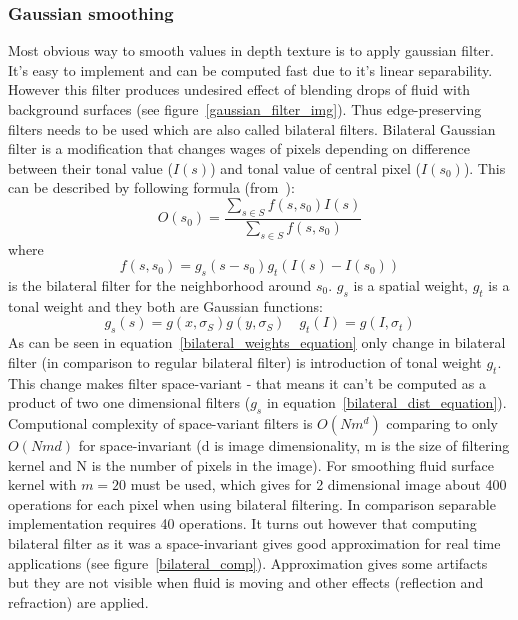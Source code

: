 \subsubsection{Gaussian smoothing} \label{sec:gaussiansmoothing}
Most obvious way to smooth values in depth texture is to apply gaussian filter. It's easy to implement and can be computed fast due to it's linear separability. However this filter produces undesired effect of blending drops of fluid with background surfaces (see figure~\ref{gaussian_filter_img}). 
Thus edge-preserving filters needs to be used which are also called bilateral filters. Bilateral Gaussian filter is a modification that changes wages of pixels depending on difference between their tonal value ($I(s)$) and tonal value of central pixel ($I(s_0)$). This can be described by following formula (from~\cite{PhamVliet2005}): 
\begin{equation}
\label{bilateral_equation}
O(s_0) = \frac{\sum_{s \in S}f(s, s_0)I(s)}{\sum_{s \in S}f(s, s_0)}
\end{equation}
where 
\begin{equation}
\label{bilateral_weights_equation}
f(s, s_0) = g_s(s-s_0)g_t(I(s)-I(s_0))
\end{equation}
is the bilateral filter for the neighborhood around $s_0$. $g_s$ is a spatial weight, $g_t$ is a tonal weight and they both are Gaussian functions:
\begin{equation}
\label{bilateral_dist_equation}
g_s(s) = g(x, \sigma_S)g(y, \sigma_S)  \quad   g_t(I) = g(I, \sigma_t)
\end{equation}
As can be seen in equation~\ref{bilateral_weights_equation} only change in bilateral filter (in comparison to regular bilateral filter) is introduction of tonal weight $g_t$. This change makes filter space-variant - that means it can't be computed as a product of two one dimensional filters ($g_s$ in equation~\ref{bilateral_dist_equation}). 
Computional complexity of space-variant filters is $O(Nm^d)$ comparing to only $O(Nmd)$ for space-invariant (d is image dimensionality, m is the size of filtering kernel and N is the number of pixels in the image). For smoothing fluid surface kernel with $m = 20$ must be used, which gives for 2 dimensional image about 400 operations for each pixel when using bilateral filtering. In comparison separable implementation requires 40 operations. It turns out however that computing bilateral filter as it was a space-invariant gives good approximation for real time applications (see figure~\ref{bilateral_comp}). Approximation gives some artifacts but they are not visible when fluid is moving and other effects (reflection and refraction) are applied.

